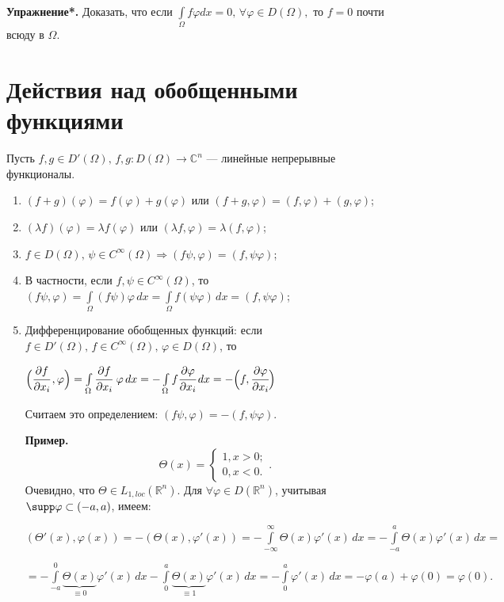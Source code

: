 \documentclass[unicode,12pt,draft]{article}
\begin{document}
\textbf{Упражнение*.} Доказать, что если
$\int\limits_{\Omega}f\varphi dx=0,\,\forall\varphi\in D(\Omega),$
то $f=0$ почти всюду в $\Omega$.


\section{Действия над обобщенными функциями}

Пусть $f,g\in D'(\Omega),\,f,g\colon D(\Omega)\to\mathbb C^n$ ---
линейные непрерывные функционалы.

\begin{enumerate}
\item $(f+g)(\varphi)=f(\varphi)+g(\varphi)$ или
$(f+g,\varphi)=(f,\varphi)+(g,\varphi)$;
\item $(\lambda f)(\varphi)=\lambda f(\varphi)$ или $(\lambda
f,\varphi)=\lambda(f,\varphi)$;
\item $f\in D(\Omega),\,\psi\in C^{\infty}(\Omega) \Rightarrow
(f\psi,\varphi)=(f,\psi\varphi)$;
\item В частности, если $f,\psi\in C^{\infty}(\Omega)$, то
$(f\psi,\varphi)=\int\limits_{\Omega}(f\psi)\varphi\,
dx=\int\limits_{\Omega}f(\psi\varphi)\,dx=(f,\psi\varphi)$;
\item Дифференцирование обобщенных функций: если $f\in D'(\Omega),\,f\in C^{\infty}(\Omega),\,\varphi\in
D(\Omega)$, то

$\Bigl(\cfrac{\partial f}{\partial
x_i}\,,\varphi\Bigr)=\int\limits_{\Omega}\cfrac {\partial
f}{\partial x_i}\,\,\varphi\,dx=-\int\limits_{\Omega}f\cfrac
{\partial \varphi}{\partial x_i}\,dx=-\Bigl(f,\cfrac {\partial
\varphi}{\partial x_i}\Bigr)$

Считаем это определением: $(f\psi,\varphi)=-(f,\psi\varphi).$

\textbf{Пример.} $$\Theta(x)=\begin{cases} 1, x>0;\\ 0,
x<0.\end{cases}.$$ Очевидно, что $\Theta\in L_{1,loc}(\mathbb
R^n)$. Для $\forall \varphi \in D(\mathbb R^n)$, учитывая $\supp
\varphi\subset(-a,a)$, имеем:

$(\Theta'(x),\varphi(x))=-(\Theta(x),\varphi'(x))=-\int\limits_{-\infty}^{\infty}\Theta(x)\varphi'(x)\,dx=-\int\limits_{-a}^{a}\Theta(x)\varphi'(x)\,dx=$

$=-\int\limits_{-a}^0\underbrace{\Theta(x)}_{\equiv0}\varphi'(x)\,dx-\int\limits_0^a\underbrace{\Theta(x)}_{\equiv1}\varphi'(x)\,dx=-\int\limits_0^a\varphi'(x)\,dx=-\varphi(a)+\varphi(0)=\varphi(0).$


\end{enumerate}
\end{document}
